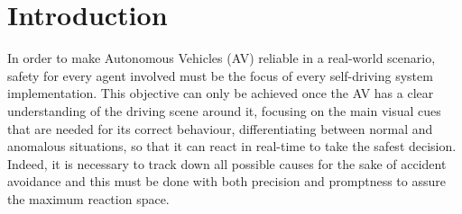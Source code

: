 \section{Introduction}

In order to make Autonomous Vehicles (AV) reliable in a real-world scenario, safety for every agent involved must be the focus of every self-driving system implementation.
This objective can only be achieved once the AV has a clear understanding of the driving scene around it, focusing on the main visual cues that are needed for its correct behaviour, differentiating between normal and anomalous situations, so that it can react in real-time to take the safest decision.
Indeed, it is necessary to track down all possible causes for the sake of accident avoidance and this must be done with both precision and promptness to assure the maximum reaction space.

